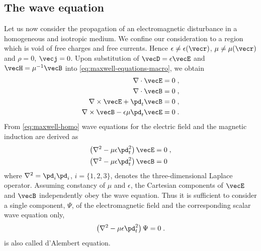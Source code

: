 \documentclass[
twoside,
openright,
titlepage,
numbers=noenddot,
headinclude,
fleqn,
a4paper,
footinclude=true,
cleardoublepage=empty,
abstractoff,
BCOR=5mm,
paper=a4,
fontsize=11pt,
british,ngerman,american,
]{scrreprt}
\begin{document}
\subsection{The wave equation}
\label{sec:free-space}

Let us now consider the propagation of an electromagnetic disturbance
in a homogeneous and isotropic medium.  We confine our consideration
to a region which is void of free charges and free currents.  Hence
$\epsilon\neq\epsilon(\vecr)$, $\mu\neq\mu(\vecr)$ and $\rho=0$,
$\vecj=0$.  Upon substitution of $\vecD=\epsilon\vecE$ and
$\vecH=\mu^{-1} \vecB$ into \cref{eq:maxwell-equations-macro}, we
obtain \cite{Maxwell1864,Jackson}
\begin{equation}
  \label{eq:maxwell-homo}
  \begin{split}
    \nabla\cdot \vecE &= 0\;,\\
    \nabla\cdot \vecB &{}= 0\;,\\
    \nabla \times \vecE +\pd_t\vecB &= 0\;,\\
    \nabla \times \vecB-\epsilon\mu\pd_t\vecE &= 0\;.
  \end{split}
\end{equation}
From \cref{eq:maxwell-homo} wave equations for the electric field and
the magnetic induction are derived as \cite{Maxwell1864,Jackson}
\begin{equation}
  \label{eq:wave-equations}
  \begin{split}
         \left(\nabla^2 -\mu\epsilon\pd_t^2\right)\vecE&=0\;,
      \\ \left(\nabla^2 -\mu\epsilon\pd_t^2\right)\vecB&=0
  \end{split}
\end{equation}
where $\nabla^2=\pd_i\pd_i$, $i=\{1,2,3\}$, denotes the
three-dimensional Laplace operator.  Assuming constancy of $\mu$ and
$\epsilon$, the Cartesian components of $\vecE$ and $\vecB$
independently obey the wave equation.  Thus it is sufficient to
consider a single component, $\Psi$, of the electromagnetic field and
the corresponding scalar wave equation only,
\begin{equation}
  \label{eq:wave-equation-scalar}
  \left(\nabla^2 -\mu\epsilon\pd_t^2\right)\Psi=0 \;.
\end{equation}
 is also called d'Alembert equation.
\end{document}
